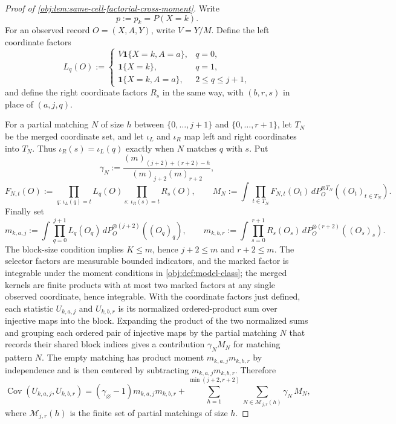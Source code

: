 \documentclass[11pt]{article}
\begin{document}
\begin{proof}[Proof of \cref{obj:lem:same-cell-factorial-cross-moment}]
Write
\[
p:=p_k=P(X=k).
\]
For an observed record \(O=(X,A,Y)\), write \(V=Y/M\).  Define the left coordinate factors
\[
L_q(O):=
\begin{cases}
V\mathbf 1\{X=k,A=a\}, & q=0,\\
\mathbf 1\{X=k\}, & q=1,\\
\mathbf 1\{X=k,A=a\}, & 2\le q\le j+1,
\end{cases}
\]
and define the right coordinate factors \(R_s\) in the same way, with \((b,r,s)\) in place of \((a,j,q)\).

For a partial matching \(N\) of size \(h\) between \(\{0,\ldots,j+1\}\) and \(\{0,\ldots,r+1\}\), let \(T_N\) be the merged coordinate set, and let \(\iota_L\) and \(\iota_R\) map left and right coordinates into \(T_N\). Thus \(\iota_R(s)=\iota_L(q)\) exactly when \(N\) matches \(q\) with \(s\). Put
\[
\gamma_N:=
\frac{(m)_{(j+2)+(r+2)-h}}{(m)_{j+2}(m)_{r+2}},
\]
\[
F_{N,t}(O):=
\prod_{q:\,\iota_L(q)=t}L_q(O)
\prod_{s:\,\iota_R(s)=t}R_s(O),
\qquad
M_N:=\int \prod_{t\in T_N}F_{N,t}(O_t)\,
  dP_O^{\otimes T_N}((O_t)_{t\in T_N}).
\]
Finally set
\[
m_{k,a,j}:=\int\prod_{q=0}^{j+1}L_q(O_q)\,
  dP_O^{\otimes(j+2)}((O_q)_q),
\qquad
m_{k,b,r}:=\int\prod_{s=0}^{r+1}R_s(O_s)\,
  dP_O^{\otimes(r+2)}((O_s)_s).
\]
The block-size condition implies \(K\le m\), hence \(j+2\le m\) and \(r+2\le m\). The selector factors are measurable bounded indicators, and the marked factor is integrable under the moment conditions in \cref{obj:def:model-class}; the merged kernels are finite products with at most two marked factors at any single observed coordinate, hence integrable. With the coordinate factors just defined, each statistic \(U_{k,a,j}\) and \(U_{k,b,r}\) is its normalized ordered-product sum over injective maps into the block. Expanding the product of the two normalized sums and grouping each ordered pair of injective maps by the partial matching \(N\) that records their shared block indices gives a contribution \(\gamma_N M_N\) for matching pattern \(N\). The empty matching has product moment \(m_{k,a,j}m_{k,b,r}\) by independence and is then centered by subtracting \(m_{k,a,j}m_{k,b,r}\). Therefore
\[
\operatorname{Cov}(U_{k,a,j},U_{k,b,r})
=
(\gamma_\varnothing-1)m_{k,a,j}m_{k,b,r}
+
\sum_{h=1}^{\min(j+2,r+2)}
\sum_{N\in\mathcal M_{j,r}(h)}
\gamma_N\,M_N,
\]
where \(\mathcal M_{j,r}(h)\) is the finite set of partial matchings of size \(h\).


\end{proof}
\end{document}
